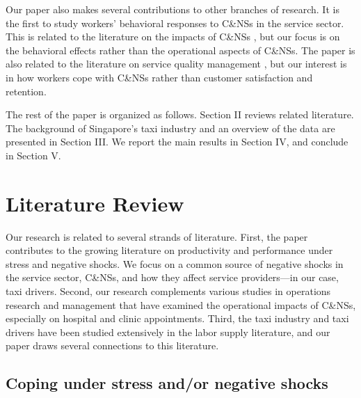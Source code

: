 \documentclass[reviewmode]{restud}
\begin{document}
Our paper also makes several contributions to other branches of research. It is the first to study workers' behavioral responses to C\&NSs in the service sector. This is related to the literature on the impacts of C\&NSs \citep{moore2001time,patrick2008reducing,norris2014empirical,feldman2014appointment}, but our focus is on the behavioral effects rather than the operational aspects of C\&NSs. The paper is also related to the literature on service quality management \citep{cohen2018frustration}, but our interest is in how workers cope with C\&NSs rather than customer satisfaction and retention. 


The rest of the paper is organized as follows. Section II reviews related literature. The background of Singapore's taxi industry and an overview of the data are presented in Section III.  We report the main results in Section IV, 
and conclude %
 in Section V.

\section{Literature Review}

Our research is related to several strands of literature. First, the paper contributes to the growing literature on productivity and performance under stress and negative shocks. We focus on a common source of negative shocks in the service sector, C\&NSs, and how they affect service providers---in our case, taxi drivers. Second, our research complements various studies in operations research and management that have examined the operational impacts of C\&NSs, especially on hospital and clinic appointments. Third, the taxi industry and taxi drivers  have been studied extensively in the labor supply literature, and our paper draws several connections to this literature.  


\subsection{Coping under stress and/or negative shocks}
\end{document}
